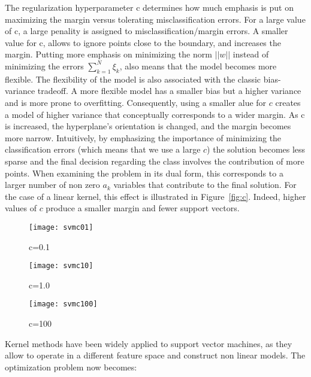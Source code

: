 \documentclass[conference,compsoc]{IEEEtran}
\begin{document}
The regularization hyperparameter c determines how much emphasis is put on maximizing the margin versus tolerating misclassification errors. For a large value of c, a large penality is assigned to misclassification/margin errors. A smaller value for c, allows to ignore points close to the boundary, and increases the margin. Putting more emphasis on minimizing the norm $||w||$ instead of minimizing the errors $\sum_{k=1}^{N}\xi_k$, also means that the model becomes more flexible. The flexibility of the model is also associated with the classic bias-variance tradeoff. A more flexible model has a smaller bias but a higher variance and is more prone to overfitting. Consequently, using a smaller alue for $c$ creates a model of higher variance that conceptually corresponds to a wider margin. As c is increased, the hyperplane's orientation is changed, and the margin becomes more narrow. Intuitively, by emphasizing the importance of minimizing the classification errors (which means that we use a large $c$) the solution becomes less sparse and the final decision regarding the class involves the contribution of more points. When examining the problem in its dual form, this corresponds to a larger number of non zero $a_k$ variables that contribute to the final solution. For the case of a linear kernel, this effect is illustrated in Figure~\ref{fig:c}. Indeed, higher values of $c$ produce a smaller margin and fewer support vectors. 

\begin{figure*}
        \begin{subfigure}{0.33\linewidth}
            \texttt{[image: svmc01]}
            \caption{c=0.1}
        \end{subfigure}
        \begin{subfigure}{0.33\linewidth}
            \texttt{[image: svmc10]}
            \caption{c=1.0}
        \end{subfigure}
        \begin{subfigure}{0.33\linewidth}
            \texttt{[image: svmc100]}
            \caption{c=100}
        \end{subfigure}

        \caption{Varying the $c$ parameter for the linear kernel }        
                    
        \label{fig:c}
    \end{figure*}
 

Kernel methods have been widely applied to support vector machines, as they allow to operate in a different feature space and construct non linear models. The optimization problem now becomes:
\end{document}
